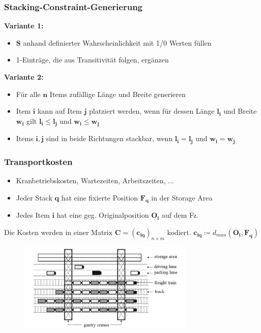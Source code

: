 \documentclass{beamer}
\begin{document}
\begin{frame}
\frametitle{Stacking-Constraint-Generierung}
\textbf{Variante 1:}
\begin{itemize}
  \item $\boldsymbol{S}$ anhand definierter Wahrscheinlichkeit mit 1/0 Werten füllen
  \item 1-Einträge, die aus Transitivität folgen, ergänzen
\end{itemize}
\textbf{Variante 2:}
\begin{itemize}
  \item Für alle $\boldsymbol{n}$ Items zufällige Länge und Breite generieren
  \item Item $\boldsymbol{i}$ kann auf Item $\boldsymbol{j}$ platziert werden, wenn für dessen Länge $\boldsymbol{l_i}$ und Breite
  $\boldsymbol{w_i}$ gilt $\boldsymbol{l_i} \leq \boldsymbol{l_j}$ und $\boldsymbol{w_i} \leq \boldsymbol{w_j}$
  \item Items $\boldsymbol{i}, \boldsymbol{j}$ sind in beide Richtungen stackbar, wenn $\boldsymbol{l_i} =
  \boldsymbol{l_j}$ und $\boldsymbol{w_i} = \boldsymbol{w_j}$
\end{itemize}
\end{frame}

\begin{frame}
\frametitle{Transportkosten}

\begin{itemize}
  \item Kranbetriebskosten, Wartezeiten, Arbeitszeiten, ...
  \item Jeder Stack $\boldsymbol{q}$ hat eine fixierte Position $\boldsymbol{F_q}$ in der Storage Area
  \item Jedes Item $\boldsymbol{i}$ hat eine geg. Originalposition $\boldsymbol{O_i}$ auf dem Fz.
\end{itemize}

Die Kosten werden in einer Matrix $\boldsymbol{C} = (\boldsymbol{c_{iq}})_{n \times m}$ kodiert.\newline
$\boldsymbol{c_{iq}} \coloneqq d_{man}(\boldsymbol{O_i}, \boldsymbol{F_q})$

\begin{figure}[H]
\centering
\includegraphics[width=0.75\textwidth]{images/costs.png}\newline
\end{figure}

\end{frame}
\end{document}
